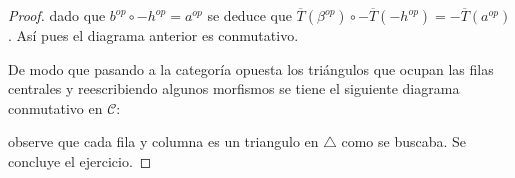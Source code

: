 \documentclass{article}
\newcommand{\cc}{\mathscr{C}}
\begin{document}
\begin{enumerate}
\begin{proof}
dado que $b^{op}\circ -h^{op}=a^{op}$ se deduce que $\overline{T}(\beta^{op})\circ -\overline{T}(-h^{op})=-\overline{T}(a^{op})$. As\'i pues el diagrama anterior es conmutativo.

\bigskip

De modo que pasando a la categoría opuesta los triángulos que ocupan las filas centrales y reescribiendo algunos morfismos se tiene el siguiente diagrama conmutativo en $\cc$:

\begin{center}
\end{center}

observe que cada fila y columna es un triangulo en $\triangle$ como se buscaba. Se concluye el ejercicio.
\end{proof}






















\end{enumerate}		
\end{document}

